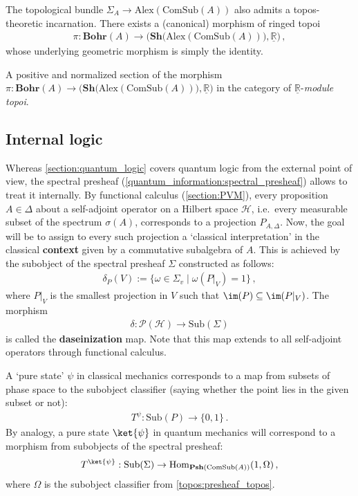     The topological bundle $\Sigma_A\rightarrow\mathrm{Alex}(\mathrm{ComSub}(A))$ also admits a topos-theoretic incarnation. There exists a (canonical) morphism of ringed topoi
    \begin{gather}
        \pi:\mathbf{Bohr}(A)\rightarrow\bigl(\mathbf{Sh}\bigl(\mathrm{Alex}(\mathrm{ComSub}(A))\bigr),\underline{\mathbb{R}}\bigr)\,,
    \end{gather}
    whose underlying geometric morphism is simply the identity.

    \begin{property}[States]
        A positive and normalized section of the morphism $\pi:\mathbf{Bohr}(A)\rightarrow\bigl(\mathbf{Sh}\bigl(\mathrm{Alex}(\mathrm{ComSub}(A))\bigr),\underline{\mathbb{R}}\bigr)$ in the category of $\underline{\mathbb{R}}$-\textit{module topoi}.
    \end{property}

\subsection{Internal logic}

    Whereas \cref{section:quantum_logic} covers quantum logic from the external point of view, the spectral presheaf (\cref{quantum_information:spectral_presheaf}) allows to treat it internally. By functional calculus (\cref{section:PVM}), every proposition $A\in\Delta$ about a self-adjoint operator on a Hilbert space $\mathcal{H}$, i.e.~every measurable subset of the spectrum $\sigma(A)$, corresponds to a projection $P_{A,\Delta}$. Now, the goal will be to assign to every such projection a `classical interpretation' in the classical \textbf{context} given by a commutative subalgebra of $A$. This is achieved by the subobject of the spectral presheaf $\Sigma$ constructed as follows:
    \begin{gather*}
        \delta_P(V) := \{\omega\in\Sigma_v\mid\omega(P|_V)=1\}\,,
    \end{gather*}
    where $P|_V$ is the smallest projection in $V$ such that $\im(P)\subseteq\im(P|_V)$. The morphism
    \begin{gather*}
        \delta:\mathcal{P}(\mathcal{H})\rightarrow\mathrm{Sub}(\Sigma)
    \end{gather*}
    is called the \textbf{daseinization} map. Note that this map extends to all self-adjoint operators through functional calculus.

    A `pure state' $\psi$ in classical mechanics corresponds to a map from subsets of phase space to the subobject classifier (saying whether the point lies in the given subset or not):
    \begin{gather*}
        T^\psi:\mathrm{Sub}(P)\rightarrow\{0,1\}\,.
    \end{gather*}
    By analogy, a pure state $\ket{\psi}$ in quantum mechanics will correspond to a morphism from subobjects of the spectral presheaf:
    \begin{gather*}
        T^{\ket{\psi}}:\mathrm{Sub}(\Sigma)\rightarrow\mathrm{Hom}_{\mathbf{Psh}(\mathrm{ComSub}(A))}(1,\Omega)\,,
    \end{gather*}
    where $\Omega$ is the subobject classifier from \cref{topos:presheaf_topos}.